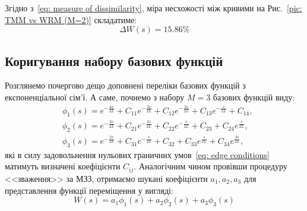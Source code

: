 \documentclass{mathreport}
\begin{document}
Згідно з~\eqref{eq: measure of dissimilarity}, міра несхожості між кривими на Рис.~\ref{pic: TMM vs WRM (M=2)} складатиме:
\begin{equation}\label{eq: measure of dissimilarity (M=2) value}
    \Delta W(s) = 15.86\%
\end{equation}

\subsection*{Коригування набору базових функцій}

Розглянемо почергово дещо доповнені переліки базових функцій з експоненціальної сім'ї. А саме, почнемо з набору $M=3$ базових функцій виду:
\begin{align}
    & \phi_1(s) = e^{-\frac{4s}{2L}} + C_{11}e^{-\frac{3s}{2L}} + C_{12}e^{-\frac{2s}{2L}} + C_{13}e^{-\frac{s}{2L}} + C_{14}, \label{eq: M=3 trial phi1(x)} \\
    & \phi_2(s) = e^{-\frac{3s}{2L}} + C_{21}e^{-\frac{2s}{2L}} + C_{22}e^{-\frac{s}{2L}} + C_{23} + C_{24}e^{\frac{s}{2L}}, \label{eq: M=3 trial phi2(x)} \\
    & \phi_3(s) = e^{-\frac{2s}{2L}} + C_{31}e^{-\frac{s}{2L}} + C_{32} + C_{33}e^{\frac{s}{2L}} + C_{34}e^{\frac{2s}{2L}}, \label{eq: M=3 trial phi3(x)}
\end{align}
які в силу задовольнення нульових граничних умов~\eqref{eq: edge conditions} матимуть визначені коефіцієнти $C_{ij}$. Аналогічним чином провівши процедуру <<зваження>> за МЗЗ, отримаємо шукані коефіцієнти $a_1,a_2,a_3$ для представлення функції переміщення у вигляді: 
\begin{equation}\label{eq: W(s) M=3 approximation}
    W(s) = a_1\phi_1(s) + a_2\phi_2(s) + a_3\phi_3(s)
\end{equation}
\end{document}

